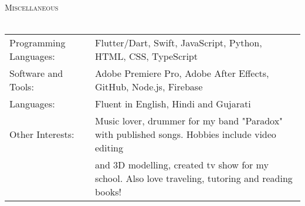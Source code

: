 \documentclass[a4paper]{article}
\newcommand{\lineunder} {
    \vspace*{-8pt} \\
    \hspace*{-10pt} \hrulefill \\
}
\newcommand{\header} [1] {
    {\hspace*{-10pt}\vspace*{6pt} \textsc{#1}}
    \vspace*{-6pt} \lineunder
}
\begin{document}
\header{Miscellaneous}
\begin{tabular}{ l l }
	Programming Languages: & Flutter/Dart, Swift, JavaScript, Python, HTML, CSS, TypeScript     \\
	Software and Tools:    & Adobe Premiere Pro, Adobe After Effects, GitHub, Node.js, Firebase \\
    Languages:    & Fluent in English, Hindi and Gujarati \\
    Other Interests:    & Music lover, drummer for my band "Paradox" with published songs. Hobbies include video editing \\
                        & and 3D modelling, created tv show for my school. Also love traveling, tutoring and reading books! \\
\end{tabular}

\vspace*{-80pt}
\end{document}
